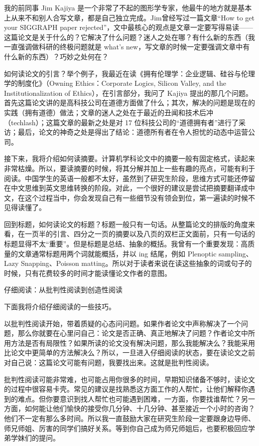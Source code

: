 我的前同事 Jim Kajiya 是一个非常了不起的图形学专家，他最牛的地方就是基本上从来不和别人合写文章，都是自己独立完成。Jim曾经写过一篇文章“How to get your SIGGRAPH paper rejected”，文中最核心的观点是文章一定要写得易读——这篇论文是关于什么的？它解决了什么问题？迷人之处在哪？有什么新的东西（我一直强调做科研的终极问题就是 what's new，写文章的时候一定要强调文章中有什么新的东西）？巧妙之处何在？


如何读论文的引言？举个例子，我最近在读《拥有伦理学：企业逻辑、硅谷与伦理学的制度化》（Owning Ethics：Corporate Logics, Silicon Valley, and the Institutionalization of Ethics），在引言部分，我问了 Kajiya 提出的那几个问题。首先这篇论文讲的是高科技公司在道德方面做了什么；其次，解决的问题是现在的实践（拥有道德）做法；文章的迷人之处在于最近的丑闻和技术后冲（techlash）；这篇文章的最新之处是对 17 位科技公司的“道德拥有者”进行了采访；最后，论文的神奇之处是得出了结论：道德所有者在令人担忧的动态中运营公司。

接下来，我将介绍如何读摘要。计算机学科论文中的摘要一般有固定格式，读起来非常枯燥。所以，要读摘要的时候，将其分解并加上一些有趣的亮点，可能有利于阅读。中国学生的英语一般都不太好，虽然到了研究生阶段，思维方式可能还停留在中文思维到英文思维转换的阶段。对此，一个很好的建议是尝试把摘要翻译成中文，在这个过程当中，你会发现自己有一些细节没有领会到位，第一遍读的时候不见得读懂了。



回到标题，如何读论文的标题？标题一般只有一句话。从整篇论文的排版的角度来看，在一页半的引言、四分之一页的摘要以及八页的双栏正文面前，只有一句话的标题显得不太“重要”。但是标题是总结、抽象的概括。我曾有一个重要发现：高质量的文章通常标题用两个词就能概括，并以 ing 结尾，例如 Plenoptic sampling、Lazy Snapping、Poisson matting。所以对于读者来说在读这些抽象的词或句子的时候，只有花费较多的时间才能读懂论文作者的意图。


仔细阅读：从批判性阅读到创造性阅读



下面我将介绍仔细阅读的一些技巧。


以批判性阅读开始，带着质疑的心态问问题。如果作者论文中声称解决了一个问题，那么你就要在心里问自己：论文是否正确、真正地解决了问题？作者论文中所用方法是否有局限性？如果所读的论文没有解决问题，那么我能解决么？我能采用比论文中更简单的方法解决么？所以，一旦进入仔细阅读的状态，要在读论文之前对自己说：这篇论文可能有问题，我要找出来。这就是批判性阅读。

批判性阅读可能非常难，也可能占用你很多的时间，早期知识储备不够时，读论文的过程中很容易卡壳。常见的建议是找熟悉这方面工作的人帮忙，让他们解释你遇到的难点。但你要意识到找人帮忙也可能遇到困难，一方面，你要找谁帮忙？另一方面，如何能让他们愉快的接受你几分钟、十几分钟、甚至接近一个小时的咨询？他们不一定有那么多时间。所以我一直鼓励大家在研究生阶段一定要跟身边导师、师兄师姐、厉害的同学们搞好关系。等到你自己成为师兄师姐后，也要积极回应学弟学妹们的提问。

